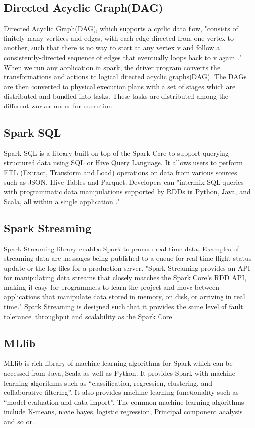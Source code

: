 \documentclass[9pt,twocolumn,twoside]{styles/osajnl}
\begin{document}
\subsection{Directed Acyclic Graph(DAG)}
Directed Acyclic Graph(DAG), which supports a cyclic data flow, "consists of finitely many vertices and edges, with each edge directed from one vertex to another, such that there is no way to start at any vertex v and follow a consistently-directed sequence of edges that eventually loops back to v again \cite{wiki-DAG}." When we run any application in spark, the driver program converts the transformations and actions to logical directed acyclic graphs(DAG). The DAGs are then converted to physical execution plans with a set of stages which are distributed and bundled into tasks. These tasks are distributed among the different worker nodes for execution.

\subsection{Spark SQL}
Spark SQL\cite{book-spark} is a library built on top of the Spark Core to support
querying structured data using SQL or Hive Query Language. It allows
users to perform ETL (Extract, Transform and Load) operations on data
from various sources such as JSON, Hive Tables and Parquet. Developers
can "intermix SQL queries with programmatic data manipulations
supported by RDDs in Python, Java, and Scala, all within a single
application \cite{book-spark}."

\subsection{Spark Streaming}
Spark Streaming \cite{book-spark} library enables Spark to process real time
data. Examples of streaming data are messages being published to a
queue for real time flight status update or the log files for a
production server. "Spark Streaming provides an API for manipulating
data streams that closely matches the Spark Core’s RDD API, making it
easy for programmers to learn the project and move between
applications that manipulate data stored in memory, on disk, or
arriving in real time." Spark Streaming is designed such that it
provides the same level of fault tolerance, throughput and scalability
as the Spark Core.

\subsection{MLlib}
MLlib \cite{book-spark} is rich library of machine learning algorithms for Spark which
can be accessed from Java, Scala as well as Python. It provides Spark
with machine learning algorithms such as “classification, regression,
clustering, and collaborative filtering”. It also provides machine
learning functionality such as “model evaluation and data import”. The
common machine learning algorithms include K-means, navie bayes,
logistic regression, Principal component analysis and so on.
\end{document}

